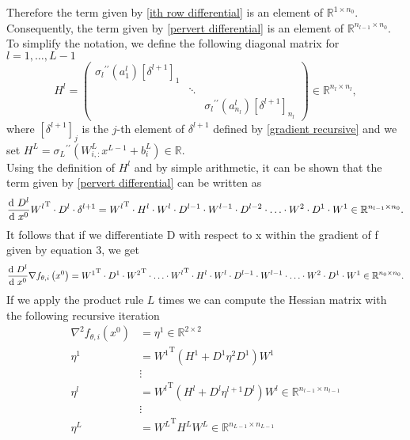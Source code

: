 Therefore the term given by \cref{ith row differential} is an element of $\mathbb{R}^{1 \times n_0}$. Consequently, the term given by \cref{pervert differential} is an element of $\mathbb{R}^{n_{l-1} \times n_0}$. \\
To simplify the notation, we define the following diagonal matrix for $l = 1, \ldots, L-1$
\begin{equation}
    \label{second:derivative:activation:function}
    H^{l} = \begin{pmatrix} {\sigma_{l}}^{\prime \prime} \left( a^{l}_1 \right) \left[ \delta^{l+1} \right]_1 & & \\ & \ddots & \\ & & {\sigma_{l}}^{\prime \prime} \left( a^{l}_{n_l} \right) \left[ \delta^{l+1} \right]_{n_l} \end{pmatrix} \in \mathbb{R}^{n_l \times n_l}, 
\end{equation}
where $\left[ \delta^{l+1} \right]_j$ is the $j$-th element of $\delta^{l+1}$ defined by \cref{gradient recursive} and we set $H^{L} = {\sigma_L}^{\prime \prime} \left(W^L_{i,:} x^{L-1}  + b^{L}_{i} \right) \in \mathbb{R}$. \\
Using the definition of $H^{l}$ and by simple arithmetic, it can be shown that the term given by \cref{pervert differential} can be written as
\begin{equation*}
    \frac{\textup{d} \ D^{l}}{\textup{d} \ x^0} {W^{l}}^{\mathrm{T}} \cdot D^{l} \cdot \delta^{l+1} = {W^{l}}^{\mathrm{T}} \cdot H^{l} \cdot W^l \cdot D^{l-1} \cdot W^{l-1} \cdot D^{l-2} \cdot \ldots \cdot W^2 \cdot D^1 \cdot W^{1} \in \mathbb{R}^{n_{l-1} \times n_0}.
\end{equation*}
It follows that if we differentiate D with respect to x within the gradient of f given by equation 3, we get 
\begin{equation*}
    \frac{\textup{d} \ D^{l}}{\textup{d} \ x^0} \nabla f_{\theta, i} \left(x^0\right) = {W^{1}}^{\mathrm{T}} \cdot D^{1} \cdot {W^{2}}^{\mathrm{T}} \cdot \ldots \cdot {W^{l}}^{\mathrm{T}} \cdot H^{l} \cdot W^l \cdot D^{l-1} \cdot W^{l-1} \cdot \ldots \cdot W^2 \cdot D^1 \cdot W^{1} \in \mathbb{R}^{n_{0} \times n_0}.
\end{equation*}
If we apply the product rule $L$ times we can compute the Hessian matrix with the following recursive iteration
\begin{align*}
    \nabla^{2} f_{\theta, i} \left(x^0\right) & = \eta^{1} \in \mathbb{R}^{2 \times 2} \\
    \eta^{1} & = {W^{1}}^{\mathrm{T}} \left( H^{1} + D^{1} \eta^{2} D^{1} \right) W^{1} \\
    & \vdots \\
    \eta^{l} & = {W^{l}}^{\mathrm{T}} \left( H^{l} + D^{l} \eta^{l+1} D^{l} \right) W^{l} \in \mathbb{R}^{n_{l-1} \times n_{l-1}} \\
    & \vdots \\
    \eta^{L} & = {W^{L}}^{\mathrm{T}} H^{L} W^{L} \in \mathbb{R}^{n_{L-1} \times n_{L-1}}
\end{align*} 




